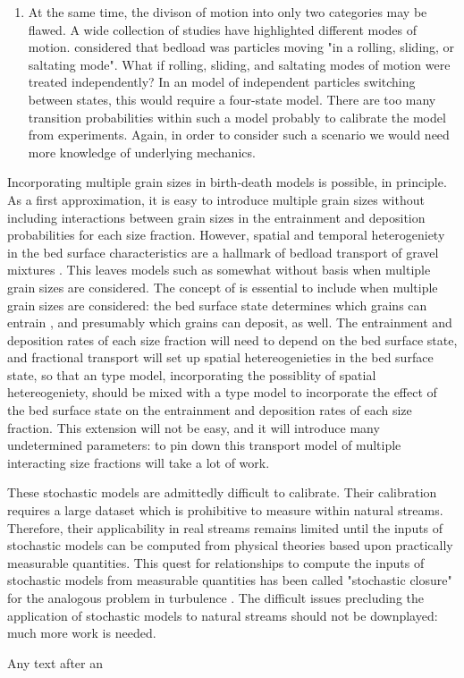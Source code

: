\begin{enumerate}
	\item At the same time, the divison of motion into only two categories may be flawed. A wide collection of studies have highlighted different modes of motion. \citet{Einstein1950} considered that bedload was particles moving "in a rolling, sliding, or saltating mode". What if rolling, sliding, and saltating modes of motion were treated independently? In an \citet{Ancey2006} model of independent particles switching between states, this would require a four-state model. There are too many transition probabilities within such a model probably to calibrate the model from experiments. Again, in order to consider such a scenario we would need more knowledge of underlying mechanics. 
	
\end{enumerate}

Incorporating multiple grain sizes in birth-death models is possible, in principle. 
As a first approximation, it is easy to introduce multiple grain sizes without including interactions between grain sizes in the entrainment and deposition probabilities for each size fraction. 
However, spatial and temporal heterogeniety in the bed surface characteristics are a hallmark of bedload transport of gravel mixtures \citep{Hassan2008}. 
This leaves models such as \citet{Ancey2008} somewhat without basis when multiple grain sizes are considered. 
The concept of \citet{Turowski} is essential to include when multiple grain sizes are considered: the bed surface state determines which grains can entrain \citep[e.g.][]{Wilcock2003, Parker1982}, and presumably which grains can deposit, as well. 
The entrainment and deposition rates of each size fraction will need to depend on the bed surface state, and fractional transport will set up spatial hetereogenieties in the bed surface state, so that an \citet{Ancey2014} type model, incorporating the possiblity of spatial hetereogeniety, should be mixed with a \citet{Turowski2009} type model to incorporate the effect of the bed surface state on the entrainment and deposition rates of each size fraction. 
This extension will not be easy, and it will introduce many undetermined parameters: to pin down this transport model of multiple interacting size fractions will take a lot of work. 


These stochastic models are admittedly difficult to calibrate. 
Their calibration requires a large dataset which is prohibitive to measure within natural streams. 
Therefore, their applicability in real streams remains limited until the inputs of stochastic models can be computed from physical theories based upon practically measurable quantities. 
This quest for relationships to compute the inputs of stochastic models from measurable quantities has been called "stochastic closure" for the analogous problem in turbulence \citep{Heyman2016}. 
The difficult issues precluding the application of stochastic models to natural streams should not be downplayed: much more work is needed. 




Any text after an \endinput is ignored.
You could put scraps here or things in progress.
